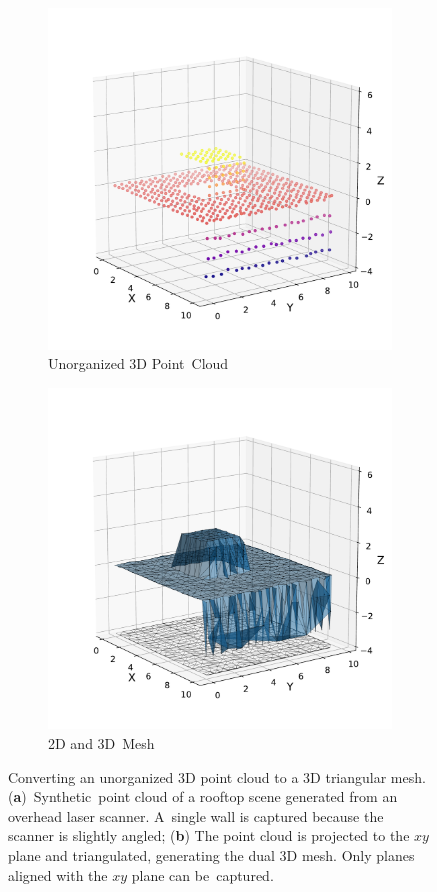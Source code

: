 \vspace{-6pt}

\begin{figure}[H]
\centering
  \begin{subfigure}{.48\linewidth}
    \centering\includegraphics[width=.65\linewidth]{chapter_3_polylidar3d/imgs/Basic25DAlgorithm_pointcloud.pdf}
    \caption{\label{fig:ch3_25DPoints}Unorganized 3D Point~Cloud}\vspace{6pt}
  \end{subfigure}
  \begin{subfigure}{.48\linewidth}
    \centering\includegraphics[width=.65\linewidth]{chapter_3_polylidar3d/imgs/Basic25DAlgorithm_mesh.pdf}
    \caption{\label{fig:ch3_25DMesh}2D and 3D~Mesh}\vspace{6pt}
  \end{subfigure}
  \caption[Converting an unorganized 3D point cloud to a 3D triangular mesh]{Converting an unorganized 3D point cloud to a 3D triangular mesh. (\textbf{a})~Synthetic~point cloud of a  rooftop scene generated from an overhead laser scanner. A~single wall is captured because the scanner is slightly angled; (\textbf{b}) The point cloud is projected to the $xy$ plane and triangulated, generating the dual 3D mesh. Only planes aligned with the $xy$ plane can be~captured.  }\label{fig:ch3_25DMeshCreation}
\end{figure}

